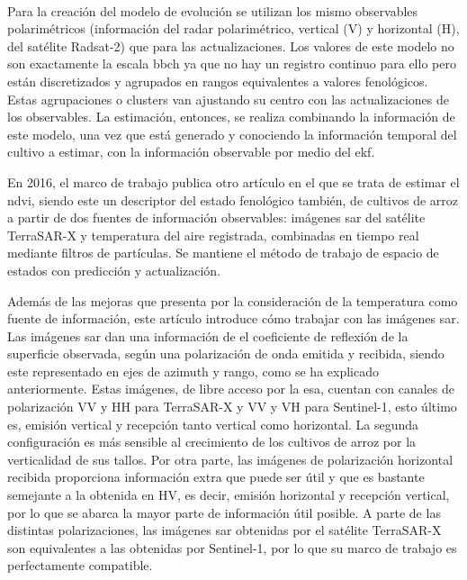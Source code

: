 \\
\par Para la creación del modelo de evolución se utilizan los mismo observables polarimétricos (información del radar polarimétrico, vertical (V) y horizontal (H), del satélite Radsat-2) que para las actualizaciones. Los valores de este modelo no son exactamente la escala \gls{bbch} ya que no hay un registro continuo para ello pero están discretizados y agrupados en rangos equivalentes a valores fenológicos. Estas agrupaciones o clusters van ajustando su centro con las actualizaciones de los observables. La estimación, entonces, se realiza combinando la información de este modelo, una vez que está generado y conociendo la información temporal del cultivo a estimar, con la información observable por medio del \gls{ekf}.
\\
\par En 2016, el marco de trabajo publica otro artículo \cite{Juanma2016} en el que se trata de estimar el \gls{ndvi}, siendo este un descriptor del estado fenológico también, de cultivos de arroz a partir de dos fuentes de información observables: imágenes \gls{sar} del satélite TerraSAR-X y temperatura del aire registrada, combinadas en tiempo real mediante filtros de partículas. Se mantiene el método de trabajo de espacio de estados con predicción y actualización. 
\\
\par Además de las mejoras que presenta por la consideración de la temperatura como fuente de información, este artículo introduce cómo trabajar con las imágenes \gls{sar}. Las imágenes \gls{sar} dan una información de el coeficiente de reflexión de la superficie observada, según una polarización de onda emitida y recibida, siendo este representado en ejes de azimuth y rango, como se ha explicado anteriormente. Estas imágenes, de libre acceso por la \gls{esa}, cuentan con canales de polarización VV y HH para TerraSAR-X y VV y VH para Sentinel-1, esto último es, emisión vertical y recepción tanto vertical como horizontal. La segunda configuración es más sensible al crecimiento de los cultivos de arroz por la verticalidad de sus tallos. Por otra parte, las imágenes de polarización horizontal recibida proporciona información extra que puede ser útil y que es bastante semejante a la obtenida en HV, es decir, emisión horizontal y recepción vertical, por lo que se abarca la mayor parte de información útil posible. A parte de las distintas polarizaciones, las imágenes \gls{sar} obtenidas por el satélite TerraSAR-X son equivalentes a las obtenidas por Sentinel-1, por lo que su marco de trabajo es perfectamente compatible. 

